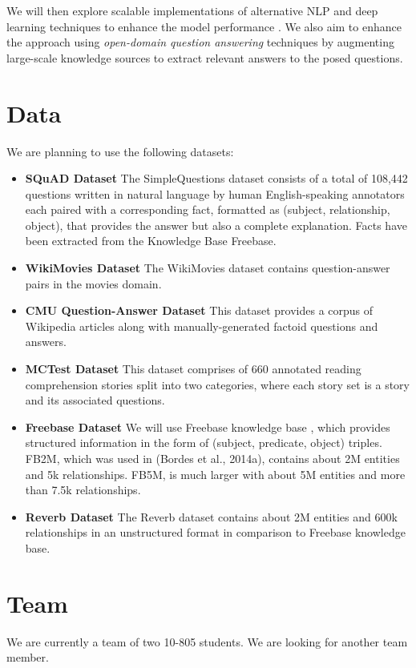 \documentclass[11pt,a4paper,English]{article}
\begin{document}
We will then explore scalable implementations of alternative NLP and deep learning techniques to enhance the model performance . We also aim to enhance the approach using \textit{open-domain question answering} techniques by augmenting large-scale knowledge sources to extract relevant answers to the posed questions. \cite{babi_paper1, babi_paper2, mctest}

\section{Data}

We are planning to use the following datasets:
\begin{itemize}
\item \textbf{SQuAD Dataset} The SimpleQuestions \cite{squad} dataset consists of a total of 108,442 questions written in natural language by human English-speaking annotators each paired with a corresponding fact, formatted as (subject, relationship, object), that provides the answer but also a complete explanation. Facts have been extracted from the Knowledge Base Freebase.
\item \textbf{WikiMovies Dataset} The WikiMovies dataset \cite{wikimovies} contains question-answer pairs in the movies domain.
\item \textbf{CMU Question-Answer Dataset} This dataset \cite{smith2008question} provides a corpus of Wikipedia articles along with manually-generated factoid questions and answers.
\item \textbf{MCTest Dataset} \cite{mctest_data} This dataset comprises of 660 annotated reading comprehension stories split into two categories, where each story set is a story and its associated questions. 
\item \textbf{Freebase Dataset} We will use Freebase knowledge base \cite{freebase:datadumps}, which provides structured information in the form of (subject, predicate, object) triples. FB2M, which was used in (Bordes et al., 2014a), contains about 2M entities and 5k relationships. FB5M, is much larger with about 5M entities and more than 7.5k relationships.
\item \textbf{Reverb Dataset} The Reverb dataset \cite{reverb} contains about 2M entities and 600k relationships in an unstructured format in comparison to Freebase knowledge base.
\end{itemize}


\section{Team}

We are currently a team of two 10-805 students. We are looking for another team member.



\end{document}
